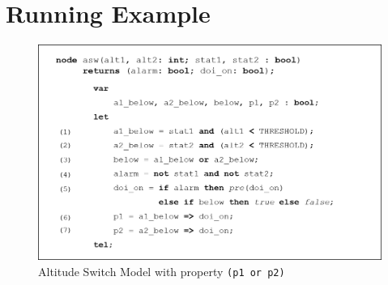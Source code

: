 \section{Running Example}
\label{sec:example}


\begin{figure}[t]
\centering
\includegraphics[width=\columnwidth]{figs/aswcode.png}
\caption{Altitude Switch Model with property \small{\texttt{(p1 or p2)}}}
\label{fig:asw}
\end{figure}

